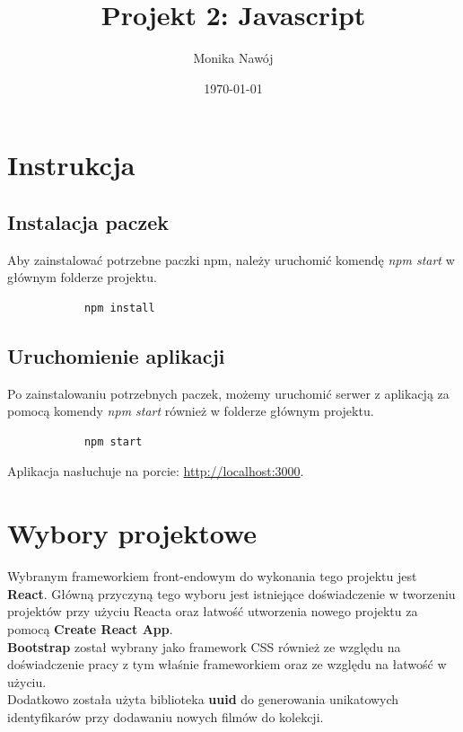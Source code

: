 \documentclass[
    12pt, %
]{fphw}
\title{Projekt 2: Javascript} %
\author{Monika Nawój} %
\date{\today} %
\institute{Politechnika Warszawska \\ Wydział Elektroniki i Technik Informacyjnych} %
\begin{document}
    \maketitle %



    \section{Instrukcja}

    \subsection{Instalacja paczek}
    Aby zainstalować potrzebne paczki npm, należy uruchomić komendę \textit{npm start} w głównym folderze projektu.
    \begin{lstlisting}
            npm install
    \end{lstlisting}

    \subsection{Uruchomienie aplikacji}
    Po zainstalowaniu potrzebnych paczek, możemy uruchomić serwer z aplikacją za pomocą komendy \textit{npm start}
    również w folderze głównym projektu.
    \begin{lstlisting}
            npm start
    \end{lstlisting}
    Aplikacja nasłuchuje na porcie: \url{http://localhost:3000}.


    \section{Wybory projektowe}
    Wybranym frameworkiem front-endowym do wykonania tego projektu jest \textbf{React}.
    Główną przyczyną tego wyboru jest istniejące doświadczenie w tworzeniu
    projektów przy użyciu Reacta oraz łatwość utworzenia nowego projektu za pomocą \textbf{Create React App}.
    \\
    \textbf{Bootstrap} został wybrany jako framework CSS również ze względu na doświadczenie
    pracy z tym właśnie frameworkiem oraz ze względu na łatwość w użyciu.
    \\
    Dodatkowo została użyta biblioteka \textbf{uuid} do generowania unikatowych identyfikarów przy dodawaniu
    nowych filmów do kolekcji.
\end{document}
